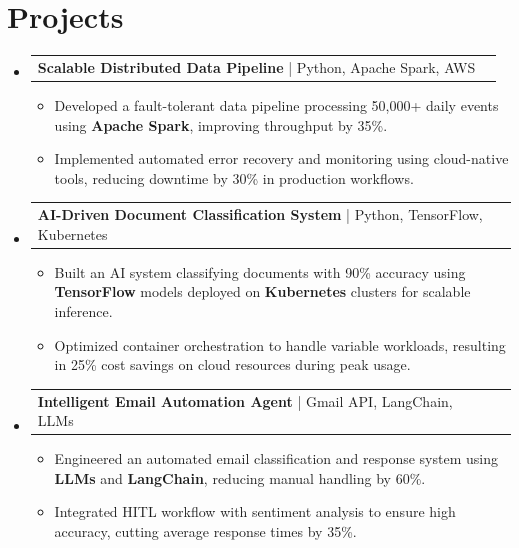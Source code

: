 \documentclass[letterpaper,11pt]{article}
\makeatletter
\newcommand{\resumeItem}[1]{
  \item\footnotesize{
    {#1 \vspace{-2pt}}
  }
}
\newcommand{\resumeProjectHeading}[2]{
    \item
    \begin{tabular*}{1.001\textwidth}{l@{\extracolsep{\fill}}r}
      \small#1 & \textbf{\small #2}\\
    \end{tabular*}\vspace{-7pt}
}
\newcommand{\resumeSubHeadingListStart}{\begin{itemize}[leftmargin=0pt, label={}]}
\newcommand{\resumeSubHeadingListEnd}{\end{itemize}}
\newcommand{\resumeItemListStart}{\begin{itemize}[leftmargin=*]}
\newcommand{\resumeItemListEnd}{\end{itemize}\vspace{-5pt}}
\makeatother
\begin{document}
\section{Projects}
    \vspace{-5pt}
    \resumeSubHeadingListStart
      \resumeProjectHeading
          {\textbf{Scalable Distributed Data Pipeline} | Python, Apache Spark, AWS}{}
          \resumeItemListStart
              \resumeItem{Developed a fault-tolerant data pipeline processing 50,000+ daily events using \textbf{Apache Spark}, improving throughput by 35\%.}
              \resumeItem{Implemented automated error recovery and monitoring using cloud-native tools, reducing downtime by 30\% in production workflows.}
          \resumeItemListEnd
          \vspace{-12pt}
      \resumeProjectHeading
          {\textbf{AI-Driven Document Classification System} | Python, TensorFlow, Kubernetes}{}
          \resumeItemListStart
              \resumeItem{Built an AI system classifying documents with 90\% accuracy using \textbf{TensorFlow} models deployed on \textbf{Kubernetes} clusters for scalable inference.}
              \resumeItem{Optimized container orchestration to handle variable workloads, resulting in 25\% cost savings on cloud resources during peak usage.}
          \resumeItemListEnd
          \vspace{-12pt}
      \resumeProjectHeading
          {\textbf{Intelligent Email Automation Agent} | Gmail API, LangChain, LLMs}{}
          \resumeItemListStart
              \resumeItem{Engineered an automated email classification and response system using \textbf{LLMs} and \textbf{LangChain}, reducing manual handling by 60\%.}
              \resumeItem{Integrated HITL workflow with sentiment analysis to ensure high accuracy, cutting average response times by 35\%.}
          \resumeItemListEnd
    \resumeSubHeadingListEnd
\end{document}

